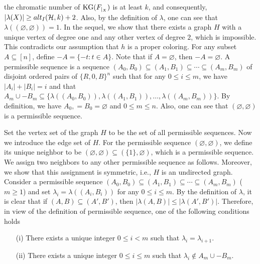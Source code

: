\documentclass[11pt]{article}
\begin{document}
the chromatic number of ${\rm KG}(F_{|_{X}})$ is at least $k$, and consequently, $|\lambda(X)|\geq alt_{I}({\cal H},k)+2$.
Also, by the definition of $\lambda$, one can see that $\lambda((\varnothing,\varnothing))=1$.
In the sequel, we show that there exists a graph $H$ with a unique vertex of
degree one and any other vertex of degree $2$, which is impossible. This contradicts our assumption that $h$ is a proper coloring.
For any subset $A\subseteq [n]$, define $-A=\{-t: t\in A\}$. Note that if $A=\varnothing$,
then $-A=\varnothing$.
A permissible sequence is a sequence
$(A_0, B_0)\subseteq (A_1, B_1)\subseteq \cdots \subseteq(A_m, B_m)$ of disjoint ordered pairs of $\{R,0,B\}^n$
such that
for any $0\leq i \leq m$, we have $|A_i|+|B_i|=i$ and that $A_m\cup -B_m\subseteq \{\lambda((A_0, B_0)),\lambda((A_1, B_1)),\ldots, \lambda((A_m, B_m))\}$. By definition, we have  $A_0,=B_0=\varnothing$ and $0\leq m\leq n$. Also, one can see that $(\varnothing,\varnothing)$ is a permissible sequence.

Set the vertex set of the graph $H$ to be the set of all permissible sequences. Now we introduce
the edge set of $H$. For the permissible sequence $(\varnothing,\varnothing)$, we define its unique neighbor to be
$(\varnothing,\varnothing)\subseteq (\{1\},\varnothing)$, which is a permissible sequence.
We assign two neighbors to any other permissible sequence as follows. Moreover, we show that this assignment is symmetric,
i.e., $H$ is an undirected graph.
Consider a permissible sequence
$(A_0, B_0)\subseteq (A_1, B_1)\subseteq \cdots \subseteq(A_m, B_m)$  ($m\geq 1$) and set $\lambda_i=\lambda((A_i, B_i))$ for any $0\leq i \leq m$.
By the definition of $\lambda$, it is clear that if $(A,B)\subseteq (A',B')$,
then  $|\lambda(A,B)|\leq |\lambda(A',B')|$. Therefore,
in view of the definition of permissible sequence,
one of the following conditions holds
\begin{enumerate}
\item[(i)]  There exists a unique  integer $0\leq i < m$ such that $\lambda_i=\lambda_{i+1}$.
\item[(ii)] There exists a unique integer $0\leq i \leq m$ such that $\lambda_i\not \in A_m\cup -B_m$.
\end{enumerate}
\end{document}
